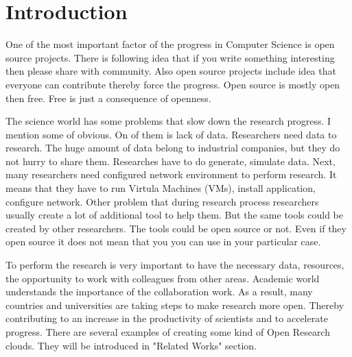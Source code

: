 \section{Introduction}

One of the most important factor of the progress in Computer Science is open source projects. There is following idea that if you write something interesting then please share with community. Also open source projects include idea that everyone can contribute thereby force the progress. Open source is mostly open then free. Free is just a consequence of openness. 

The science world has some problems that slow down the research progress. I mention some of obvious. On of them is lack of data. Researchers need data to research. The huge amount of data belong to industrial companies, but they do not hurry to share them. Researches have to do generate, simulate data. Next, many researchers need configured network environment to perform research. It means that they have to run Virtula Machines (VMs), install application, configure network. Other problem that during research process researchers usually create a lot of additional tool to help them. But the same tools could be created by other researchers. The tools could be open source or not. Even if they open source it does not mean that you you can use in your particular case.  

 
To perform the research is very important to have the necessary data, resources, the opportunity to work with colleagues from other areas. Academic world understands the importance of the collaboration work. As a result, many countries and universities are taking steps to make research more open. Thereby contributing to an increase in the productivity of scientists and to accelerate progress. There are several examples of creating some kind of Open Research clouds. They will be introduced in "Related Works" section. 

